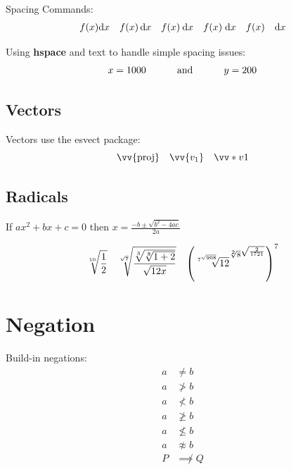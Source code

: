 \documentclass[12pt]{article}
\begin{document}
Spacing Commands:
\begin{equation*}
    \begin{array}{c c c c c}
        f(x) \mathrm{d}x & f(x) \, \mathrm{d}x & f(x) \: \mathrm{d}x & f(x) \; \mathrm{d}x & f(x) \quad \mathrm{d}x \\
    \end{array}
\end{equation*}

Using \textbf{hspace} and text to handle simple spacing issues:
\begin{equation*}
    x = 1000 \text{\hspace{1cm} and \hspace{1cm}} y = 200
\end{equation*}

\subsection{Vectors}

Vectors use the esvect package:
\begin{equation*}
    \vv{\mathrm{proj}} \quad \vv{v_1} \quad \vv*{v}{1}
\end{equation*}

\subsection{Radicals}

\begin{center}
If $ ax^2 + bx + c = 0 $ then $ \displaystyle x = \frac{-b \pm \sqrt{b^2 - 4ac}}{2a} $
\end{center}

\begin{equation*}
    \begin{array}{c c c}
        \displaystyle \sqrt[10]{\frac{1}{2}} &
        \displaystyle \sqrt[\sqrt{7}]{\frac{\sqrt[3]{\sqrt[8]{1+2}}}{\sqrt{12x}}} &
        \displaystyle \left( \sqrt[7^{\sqrt{908}}]{12}^{\sqrt[2]{8}^{\sqrt{\frac{2}{1721}}}} \right)^7 \\
    \end{array}
\end{equation*}

\section{Negation}

Build-in negations:
\begin{align*}
    a &\neq b \\
    a &\ngtr b \\
    a &\nless b \\
    a &\ngeq b \\
    a &\nleq b \\
    a &\not \approx b \\
    P &\not \implies Q \\
\end{align*}
\end{document}
